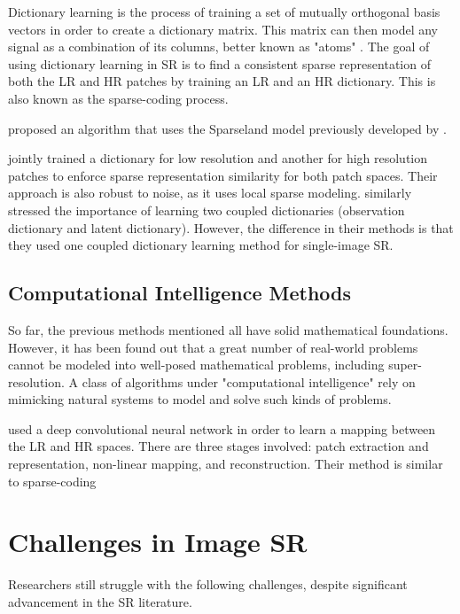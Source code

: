 Dictionary learning is the process of training a set of mutually orthogonal basis vectors in order to create a dictionary matrix. 
This matrix can then model any signal as a combination of its columns, better known as "atoms" \citep{Kreutz-Delgado2003}. The goal of using dictionary learning in SR is to find a consistent sparse representation of both the LR and HR patches by training an LR and an HR dictionary. 
This is also known as the sparse-coding process.

\cite{Zeyde2012} proposed an algorithm that uses the Sparseland model previously developed by \cite{Elad2006}.

\cite{Wright2010} jointly trained a dictionary for low resolution and another for high resolution patches to enforce sparse representation similarity for both patch spaces. Their approach is also robust to noise, as it uses local sparse modeling.
\cite{Yang2012} similarly stressed the importance of learning two coupled dictionaries (observation dictionary and latent dictionary). However, the difference in their methods is that they used one coupled dictionary learning method for single-image SR. 	


\subsection{Computational Intelligence Methods}
So far, the previous methods mentioned all have solid mathematical foundations.
However, it has been found out that a great number of real-world problems cannot be modeled into well-posed mathematical problems, including super-resolution.
A class of algorithms under "computational intelligence" rely on mimicking natural systems to model and solve such kinds of problems.

\cite{Dong2014} used a deep convolutional neural network in order to learn a mapping between the LR and HR spaces. 
There are three stages involved: patch extraction and representation, non-linear mapping, and reconstruction.
Their method is similar to sparse-coding



\section{Challenges in Image SR}
Researchers still struggle with the following challenges, despite significant advancement in the SR literature.


